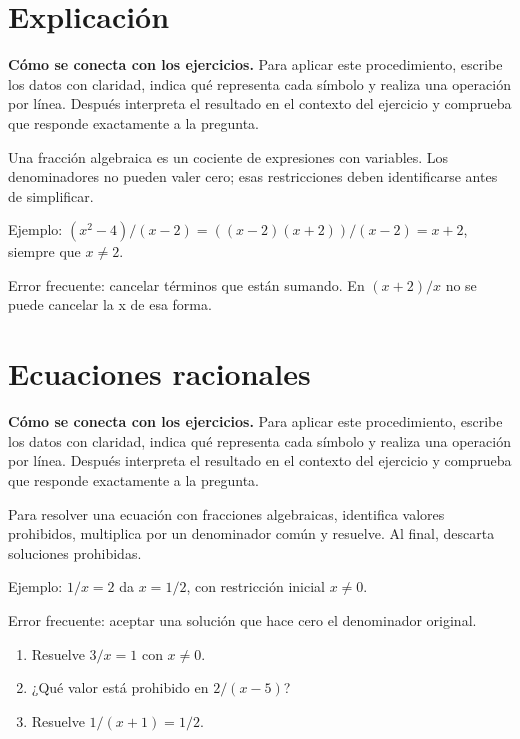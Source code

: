 \documentclass[10pt,oneside,openany]{book}
\begin{document}
\section{Explicación}

\textbf{Cómo se conecta con los ejercicios.} Para aplicar este procedimiento, escribe los datos con claridad, indica qué representa cada símbolo y realiza una operación por línea. Después interpreta el resultado en el contexto del ejercicio y comprueba que responde exactamente a la pregunta.

Una fracción algebraica es un cociente de expresiones con variables. Los denominadores no pueden valer cero; esas restricciones deben identificarse antes de simplificar.



\begin{ejemplo}
Ejemplo: $(x^2-4)/(x-2)=((x-2)(x+2))/(x-2)=x+2$, siempre que $x\neq2$.
\end{ejemplo}

\begin{ojo}
Error frecuente: cancelar términos que están sumando. En $(x+2)/x$ no se puede cancelar la x de esa forma.
\end{ojo}



\section{Ecuaciones racionales}

\textbf{Cómo se conecta con los ejercicios.} Para aplicar este procedimiento, escribe los datos con claridad, indica qué representa cada símbolo y realiza una operación por línea. Después interpreta el resultado en el contexto del ejercicio y comprueba que responde exactamente a la pregunta.

Para resolver una ecuación con fracciones algebraicas, identifica valores prohibidos, multiplica por un denominador común y resuelve. Al final, descarta soluciones prohibidas.

\begin{ejemplo}
Ejemplo: $1/x=2$ da $x=1/2$, con restricción inicial $x\neq0$.
\end{ejemplo}

\begin{ojo}
Error frecuente: aceptar una solución que hace cero el denominador original.
\end{ojo}

\begin{practica}

\begin{enumerate}

\item Resuelve $3/x=1$ con $x\neq0$.

\item ¿Qué valor está prohibido en $2/(x-5)$?

\item Resuelve $1/(x+1)=1/2$.

\end{enumerate}

\end{practica}
\end{document}
